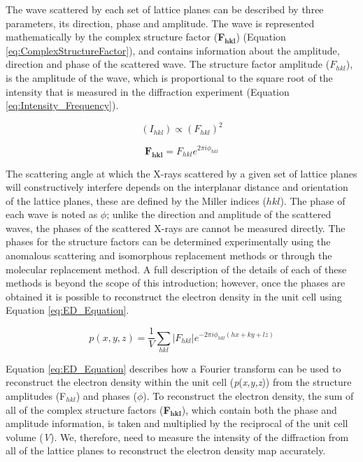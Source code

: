 The wave scattered by each set of lattice planes can be described by three parameters, its direction, phase and amplitude. The wave is represented mathematically by the complex structure factor (\textbf{F$_{\mathbf{hkl}}$}) (Equation \ref{eq:ComplexStructureFactor}), and contains information about the amplitude, direction and phase of the scattered wave. The structure factor amplitude ($F_{hkl}$), is the amplitude of the wave, which is proportional to the square root of the intensity that is measured in the diffraction experiment (Equation \ref{eq:Intensity_Frequency}). 

\begin{equation}\label{eq:Intensity_Frequency}
 (I_{hkl}) \propto (F_{hkl})^{2} 
\end{equation}

\begin{equation}\label{eq:ComplexStructureFactor}
 \mathbf{F_{hkl}} = F_{hkl}e^{2{\pi}i{\phi}_{hkl}} 
\end{equation}

The scattering angle at which the X-rays scattered by a given set of lattice planes will constructively interfere depends on the interplanar distance and orientation of the lattice planes, these are defined by the Miller indices ($hkl$). The phase of each wave is noted as $\phi$; unlike the direction and amplitude of the scattered waves, the phases of the scattered X-rays are cannot be measured directly. The phases for the structure factors can be determined experimentally using the anomalous scattering and isomorphous replacement methods or through the molecular replacement method. A full description of the details of each of these methods is beyond the scope of this introduction; however, once the phases are obtained it is possible to reconstruct the electron density in the unit cell using Equation \ref{eq:ED_Equation}.

\begin{equation}\label{eq:ED_Equation} 
p(x,y,z) = \frac{1}{V} \sum_{hkl}^{} \lvert F_{hkl} \rvert e^{-2{\pi}i{\phi}_{hkl}(hx+ky+lz)}
\end{equation} 

Equation \ref{eq:ED_Equation} describes how a Fourier transform can be used to reconstruct the electron density within the unit cell (\textit{p}(\textit{x,y,z})) from the structure amplitudes (F$_{hkl}$) and phases ($\phi$). To reconstruct the electron density, the sum of all of the complex structure factors (\textbf{F$_{\mathbf{hkl}}$}), which contain both the phase and amplitude information, is taken and multiplied by the reciprocal of the unit cell volume (\textit{V}). We, therefore, need to measure the intensity of the diffraction from all of the lattice planes to reconstruct the electron density map accurately.

